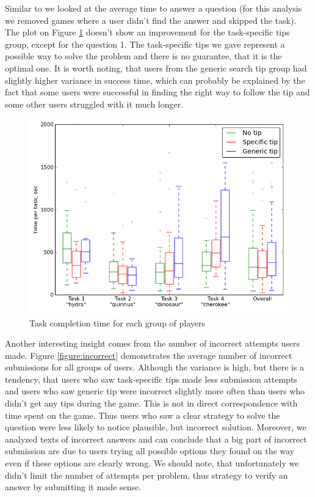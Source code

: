 \documentclass{sig-alternate}
\begin{document}
Similar to \cite{Moraveji:2011:MIU:2009916.2009966} we looked at the average time to answer a question (for this analysis we removed games where a user didn't find the answer and skipped the task).
The plot on Figure \ref{figure:task_time} doesn't show an improvement for the task-specific tips group, except for the question 1.
The task-specific tips we gave represent a possible way to solve the problem and there is no guarantee, that it is the optimal one.
It is worth noting, that users from the generic search tip group had slightly higher variance in success time, which can probably be explained by the fact that some users were successful in finding the right way to follow the tip and some other users struggled with it much longer.

\begin{figure}[ht]
\centering
\includegraphics[scale=0.4]{img/time_per_task}
\caption{Task completion time for each group of players}
\label{figure:task_time}
\end{figure}

Another interesting insight comes from the number of incorrect attempts users made.
Figure \ref{figure:incorrect} demonstrates the average number of incorrect submissions for all groups of users.
Although the variance is high, but there is a tendency, that users who saw task-specific tips made less submission attempts and users who saw generic tip were incorrect slightly more often than users who didn't get any tips during the game. 
This is not in direct correspondence with time spent on the game.
Thus users who saw a clear strategy to solve the question were less likely to notice plausible, but incorrect solution.
Moreover, we analyzed texts of incorrect answers and can conclude that a big part of incorrect submission are due to users trying all possible options they found on the way even if these options are clearly wrong.
We should note, that unfortunately we didn't limit the number of attempts per problem, thus strategy to verify an answer by submitting it made sense.
\end{document}
